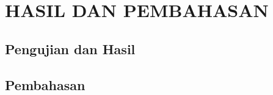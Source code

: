 \chapter{HASIL DAN PEMBAHASAN}
\label{chap:hasil_dan_pembahasan}

\section{Pengujian dan Hasil}
\label{sec:hasil}


\section{Pembahasan}
\label{sec:pembahasan}
% 